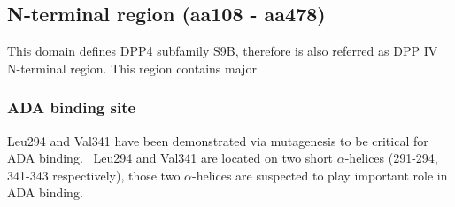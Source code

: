 \subsection{N-terminal region (aa108 - aa478)}

This domain defines DPP4 subfamily S9B, therefore is also referred as DPP IV N-terminal region. This region contains major 

\subsubsection{ADA binding site}
Leu294 and Val341 have been demonstrated via mutagenesis to be critical for ADA binding.~\cite{Abbott_1999} Leu294 and Val341 are located on two short $\alpha$-helices (291-294, 341-343 respectively), those two $\alpha$-helices are suspected to play important role in ADA binding. 
